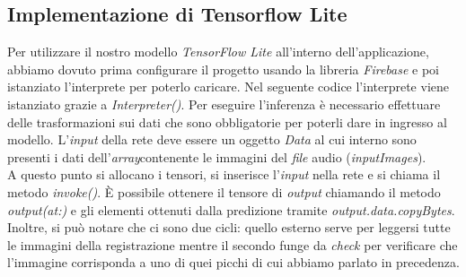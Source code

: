 \subsection{Implementazione di Tensorflow Lite}
Per utilizzare il nostro modello \textit{TensorFlow Lite} all'interno dell'applicazione, abbiamo dovuto prima configurare il progetto usando la libreria \textit{Firebase} e poi istanziato l'interprete per poterlo caricare. Nel seguente codice l'interprete viene istanziato grazie a \textit{Interpreter()}.
\vspace*{2ex}
\vspace*{2ex}
\noindent Per eseguire l'inferenza è necessario effettuare delle trasformazioni sui dati che sono obbligatorie per poterli dare in ingresso al modello. L'\textit{input} della rete deve essere un oggetto \textit{Data} al cui interno sono presenti i dati dell'\textit{array}contenente le immagini del \textit{file} audio (\textit{inputImages}).\\
A questo punto si allocano i tensori, si inserisce l'\textit{input} nella rete e si chiama il metodo \textit{invoke()}.
È possibile ottenere il tensore di \textit{output} chiamando il metodo \textit{output(at:)} e gli elementi ottenuti dalla predizione tramite \textit{output.data.copyBytes}. Inoltre, si può notare che ci sono due cicli: quello esterno serve per leggersi tutte le immagini della registrazione mentre il secondo funge da \textit{check} per verificare che l'immagine corrisponda a uno di quei picchi di cui abbiamo parlato in precedenza.
\vspace*{2ex}
